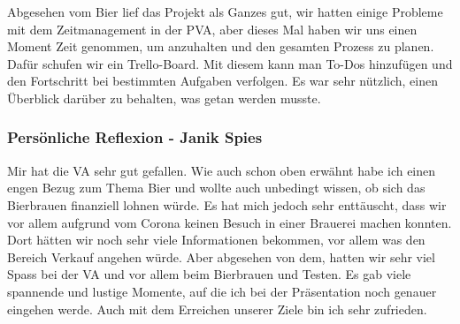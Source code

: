 Abgesehen vom Bier lief das Projekt als Ganzes gut, wir hatten einige Probleme mit dem Zeitmanagement in der PVA, aber dieses Mal haben wir uns einen Moment Zeit genommen, um anzuhalten und den gesamten Prozess zu planen. Dafür schufen wir ein Trello-Board. Mit diesem kann man To-Dos hinzufügen und den Fortschritt bei bestimmten Aufgaben verfolgen. Es war sehr nützlich, einen Überblick darüber zu behalten, was getan werden musste.
\newpage
\subsubsection{Persönliche Reflexion - Janik Spies}
Mir hat die VA sehr gut gefallen. Wie auch schon oben erwähnt habe ich einen engen Bezug zum Thema Bier und wollte auch unbedingt wissen, ob sich das Bierbrauen finanziell lohnen würde. Es hat mich jedoch sehr enttäuscht, dass wir vor allem aufgrund vom Corona keinen Besuch in einer Brauerei machen konnten. Dort hätten wir noch sehr viele Informationen bekommen, vor allem was den Bereich Verkauf angehen würde. Aber abgesehen von dem, hatten wir sehr viel Spass bei der VA und vor allem beim Bierbrauen und Testen. Es gab viele spannende und lustige Momente, auf die ich bei der Präsentation noch genauer eingehen werde. Auch mit dem Erreichen unserer Ziele bin ich sehr zufrieden.
